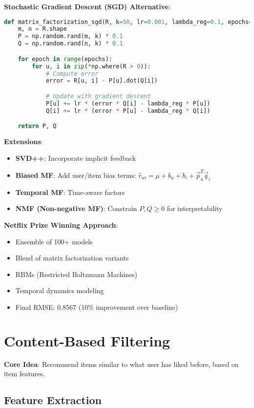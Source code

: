 \documentclass[10pt]{article}
\begin{document}
\textbf{Stochastic Gradient Descent (SGD) Alternative}:
\begin{lstlisting}[language=Python]
def matrix_factorization_sgd(R, k=50, lr=0.001, lambda_reg=0.1, epochs=100):
    m, n = R.shape
    P = np.random.rand(m, k) * 0.1
    Q = np.random.rand(n, k) * 0.1

    for epoch in range(epochs):
        for u, i in zip(*np.where(R > 0)):
            # Compute error
            error = R[u, i] - P[u].dot(Q[i])

            # Update with gradient descent
            P[u] += lr * (error * Q[i] - lambda_reg * P[u])
            Q[i] += lr * (error * P[u] - lambda_reg * Q[i])

    return P, Q
\end{lstlisting}

\textbf{Extensions}:
\begin{itemize}[leftmargin=*]
    \item \textbf{SVD++}: Incorporate implicit feedback
    \item \textbf{Biased MF}: Add user/item bias terms: $\hat{r}_{ui} = \mu + b_u + b_i + \vec{p}_u^T \vec{q}_i$
    \item \textbf{Temporal MF}: Time-aware factors
    \item \textbf{NMF (Non-negative MF)}: Constrain $P, Q \geq 0$ for interpretability
\end{itemize}

\textbf{Netflix Prize Winning Approach}:
\begin{itemize}[leftmargin=*]
    \item Ensemble of 100+ models
    \item Blend of matrix factorization variants
    \item RBMs (Restricted Boltzmann Machines)
    \item Temporal dynamics modeling
    \item Final RMSE: 0.8567 (10\% improvement over baseline)
\end{itemize}

\section{Content-Based Filtering}

\textbf{Core Idea}: Recommend items similar to what user has liked before, based on item features.

\subsection{Feature Extraction}
\end{document}
